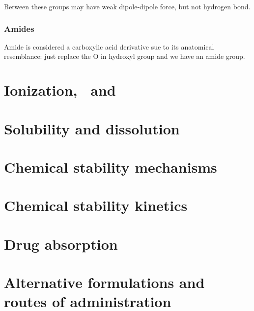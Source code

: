 \documentclass{report}
\begin{document}
		\begin{center}
			 \hfill
		\end{center}
		Between these groups may have weak dipole-dipole force, but not hydrogen bond.
		
		\subsubsection{Amides}
		Amide is considered a carboxylic acid derivative sue to its anatomical resemblance: just replace the O in hydroxyl group and we have an amide group.
		\begin{center}
		\end{center}
		
		
\newpage


\section{Ionization, \pH\ and \pKa\ }

\newpage

\section{Solubility and dissolution}

\newpage

\section{Chemical stability mechanisms}

\newpage

\section{Chemical stability kinetics}

\newpage

\section{Drug absorption}

\newpage

\section{Alternative formulations and routes of administration}

\newpage
\end{document}
